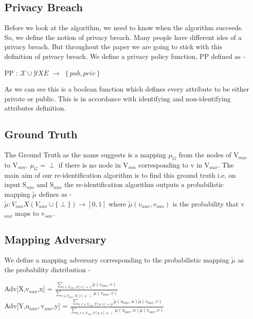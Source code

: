 \documentclass[preprint,12pt]{elsarticle}
\theoremstyle{definition}
\theoremstyle{remark}
\begin{document}
\subsection{Privacy Breach}
Before we look at the algorithm, we need to know when the algorithm succeeds. So, we define the notion of privacy breach. Many people have different ides of a privacy breach. But throughout the paper we are going to stick with this definition of privacy breach. We define a privacy policy function, PP defined as -

\begin{center}
PP : $\mathcal{X} \cup \mathcal{Y} X E$ $\rightarrow$ $\left\lbrace pub, priv\right\rbrace$
\end{center}

As we can see this is a boolean function which defines every attribute to be either private or public. This is in accordance with identifying and non-identifying attributes definition.

\subsection{Ground Truth}
The Ground Truth as the name suggests is a mapping $\mu_{G}$ from the nodes of V$_{aux}$ to V$_{san}$. $\mu_{G} = \perp$ if there is no node in V$_{san}$ corresponding to v in V$_{aux}$. The main aim of our re-identification algorithm is to find this ground truth i.e, on input S$_{san}$ and S$_{aux}$ the re-identification algorithm outputs a probabilistic mapping $\tilde{\mu}$ defines as - \\ $\tilde{\mu}: V_{san} X (V_{aux} \cup \{ \perp \}) \rightarrow [0,1]$ where $\tilde{\mu}(v_{aux}, v_{san})$ is the probability that v$_{aux}$ maps to v$_{san}$.

\subsection{Mapping Adversary}
We define a mapping adversary corresponding to the probabilistic mapping $\tilde{\mu}$ as the probability distribution -

\begin{center}
Adv[X,v$_{aux}$,x] = $\frac{\sum_{v \in V_{san} , X[v] = x} \tilde{\mu}(v_{aux},v)}{\sum_{v \in V_{san} , X[v] \neq \perp} \tilde{\mu}(v_{aux},v)}$\\
Adv[Y,u$_{aux},$v$_{aux}$,y] = $\frac{\sum_{u,v \in V_{san} , Y[u,v] = y} \tilde{\mu}(u_{aux},u)\tilde{\mu}(v_{aux},v)}{\sum_{u,v \in V_{san} , Y[u,v] \neq \perp} \tilde{\mu}(u_{aux},u)\tilde{\mu}(v_{aux},v)}$
\end{center}
\end{document}
